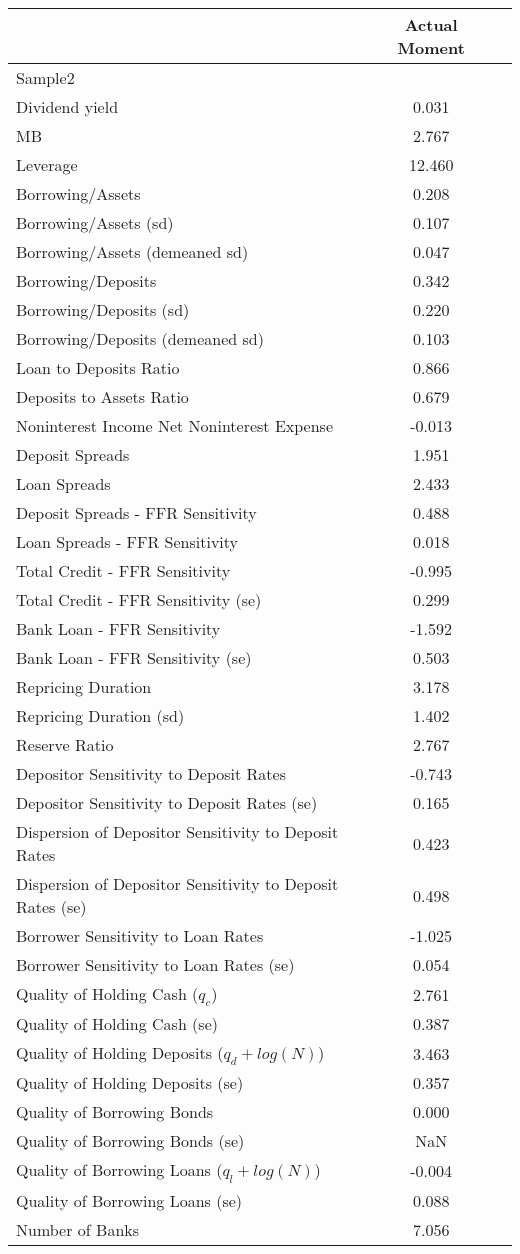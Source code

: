 \begin{tabular*}{\hsize}{@{\hskip\tabcolsep\extracolsep\fill}l*{2}{c}}\hline \hline & \textbf{Actual Moment}  &    \\ [1ex] \hline  Sample2&\\
Dividend yield&0.031&\\
MB&2.767&\\
Leverage&12.460&\\
Borrowing/Assets&0.208&\\
Borrowing/Assets (sd)&0.107&\\
Borrowing/Assets (demeaned sd)&0.047&\\
Borrowing/Deposits&0.342&\\
Borrowing/Deposits (sd)&0.220&\\
Borrowing/Deposits (demeaned sd)&0.103&\\
Loan to Deposits Ratio&0.866&\\
Deposits to Assets Ratio&0.679&\\
Noninterest Income Net Noninterest Expense&-0.013&\\
Deposit Spreads&1.951&\\
Loan Spreads&2.433&\\
Deposit Spreads - FFR Sensitivity&0.488&\\
Loan Spreads - FFR Sensitivity&0.018&\\
Total Credit - FFR Sensitivity&-0.995&\\
Total Credit - FFR Sensitivity (se)&0.299&\\
Bank Loan - FFR Sensitivity&-1.592&\\
Bank Loan - FFR Sensitivity (se)&0.503&\\
Repricing Duration&3.178&\\
Repricing Duration (sd)&1.402&\\
Reserve Ratio&2.767&\\
Depositor Sensitivity to Deposit Rates&-0.743&\\
Depositor Sensitivity to Deposit Rates (se)&0.165&\\
Dispersion of Depositor Sensitivity to Deposit Rates&0.423&\\
Dispersion of Depositor Sensitivity to Deposit Rates (se)&0.498&\\
Borrower Sensitivity to Loan Rates&-1.025&\\
Borrower Sensitivity to Loan Rates (se)&0.054&\\
Quality of Holding Cash ($q_c$)&2.761&\\
Quality of Holding Cash (se)&0.387&\\
Quality of Holding Deposits ($q_d+log(N)$)&3.463&\\
Quality of Holding Deposits (se)&0.357&\\
Quality of Borrowing Bonds&0.000&\\
Quality of Borrowing Bonds (se)&NaN&\\
Quality of Borrowing Loans ($q_l+log(N)$)&-0.004&\\
Quality of Borrowing Loans (se)&0.088&\\
Number of Banks&7.056&\\
\hline \hline \end{tabular*}

